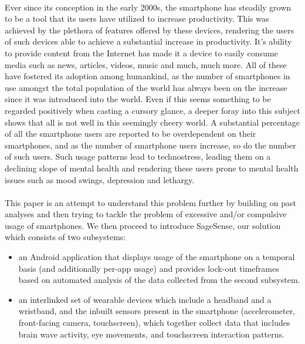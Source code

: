 \documentclass{article}
\begin{document}
\paragraph{} Ever since its conception in the early 2000s, the smartphone has steadily grown to be a tool that its users have utilized to increase productivity. This was achieved by the plethora of features offered by these devices, rendering the users of such devices able to achieve a substantial increase in productivity. It's ability to provide content from the Internet has made it a device to easily consume media such as news, articles, videos, music and much, much more. All of these have fostered its adoption among humankind, as the number of smartphones in use amongst the total population of the world has always been on the increase since it was introduced into the world. Even if this seems something to be regarded positively when casting a cursory glance, a deeper foray into this subject shows that all is not well in this seemingly cheery world\cite{lee2014dark}. A substantial percentage of all the smartphone users are reported to be overdependent on their smartphones\cite{lopez2014prevalence, merlo2013measuring, lee2016dependency, davey2014assessment, eduardo2012mobile, koo2014risk}, and as the number of smartphone users increase, so do the number of such users. Such usage patterns lead to technostress\cite{brod1984technostress}, leading them on a declining slope of mental health and rendering these users prone to mental health issues such as mood swings, depression and lethargy.\cite{van2015modeling, lee2013relationship, choi2012influence, wang2014studentlife}

\paragraph{} This paper is an attempt to understand this problem further by building on past analyses and then trying to tackle the problem of excessive and/or compulsive usage of smartphones. We then proceed to introduce SageSense, our solution which consists of two subsystems:

\begin{itemize}
    \item an Android application that displays usage of the smartphone on a temporal basis (and additionally per-app usage) and provides lock-out timeframes based on automated analysis of the data collected from the second subsystem.
    \item an interlinked set of wearable devices which include a headband and a wristband, and the inbuilt sensors present in the smartphone (accelerometer, front-facing camera, touchscreen), which together collect data that includes brain wave activity, eye movements, and touchscreen interaction patterns.
\end{itemize}
\end{document}
